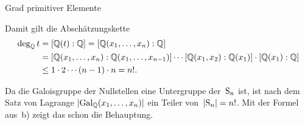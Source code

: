 \documentclass{algblatt}
\begin{document}
\begin{aufgabe}{Grad primitiver Elemente}
\begin{loesungE}
Damit gilt die Abschätzungskette
\begin{align*}
  \deg_{\mathbb{Q}} t &= [\mathbb{Q}(t):\mathbb{Q}] = [\mathbb{Q}(x_1,\ldots,x_n):\mathbb{Q}] \\
  &= [\mathbb{Q}(x_1,\ldots,x_n):\mathbb{Q}(x_1,\ldots,x_{n-1})] \cdots
    [\mathbb{Q}(x_1,x_2):\mathbb{Q}(x_1)] \cdot [\mathbb{Q}(x_1):\mathbb{Q}] \\
  &\leq 1 \cdot 2 \cdots (n-1) \cdot n = n!.
\end{align*}

\item Da die Galoisgruppe der Nullstellen eine Untergruppe der~$\mathrm{S}_n$ ist, ist
nach dem Satz von Lagrange $|\mathrm{Gal}_{\mathbb{Q}}(x_1,\ldots,x_n)|$ ein Teiler von~$|\mathrm{S}_n| =
n!$. Mit der Formel aus~b) zeigt das schon die Behauptung.
\end{loesungE}
\end{aufgabe}
\end{document}
